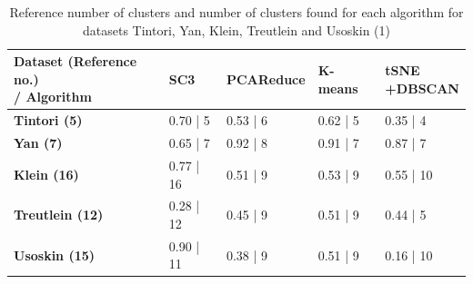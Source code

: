 \documentclass{report}
\begin{document}
{\begin{table}[H]
\centering
\caption{Reference number of clusters and number of clusters found for each algorithm for datasets Tintori, Yan, Klein, Treutlein and Usoskin (1)}
\begin{tabular}{| l | l | l | l | l |}
\hline
\parbox[c]{5cm}{\textbf{Dataset (Reference no.)\\ / Algorithm}} & 
\parbox[c]{2cm}{\textbf{SC3}} & 
\parbox[c]{2cm}{\textbf{PCAReduce}} &
\parbox[c]{2cm}{\textbf{K-means}}&
\parbox[c]{2cm}{\textbf{tSNE\\+DBSCAN}}\\
\hline
\parbox[c]{5cm}{\textbf{Tintori (5)}} & 
\parbox[c]{2cm}{0.70 | 5} & 
\parbox[c]{2cm}{0.53 | 6} &
\parbox[c]{2cm}{0.62 | 5}&
\parbox[c]{2cm}{0.35 | 4}\\
\hline
\parbox[c]{5cm}{\textbf{Yan (7)}} & 
\parbox[c]{2cm}{0.65 | 7} & 
\parbox[c]{2cm}{0.92 | 8} &
\parbox[c]{2cm}{0.91 | 7}&
\parbox[c]{2cm}{0.87 | 7}\\
\hline
\parbox[c]{5cm}{\textbf{Klein (16)}} & 
\parbox[c]{2cm}{0.77 | 16} & 
\parbox[c]{2cm}{0.51 | 9} &
\parbox[c]{2cm}{0.53 | 9}&
\parbox[c]{2cm}{0.55 | 10}\\
\hline
\parbox[c]{5cm}{\textbf{Treutlein (12)}} & 
\parbox[c]{2cm}{0.28 | 12} & 
\parbox[c]{2cm}{0.45 | 9} &
\parbox[c]{2cm}{0.51 | 9}&
\parbox[c]{2cm}{0.44 | 5}\\
\hline
\parbox[c]{5cm}{\textbf{Usoskin (15)}} & 
\parbox[c]{2cm}{0.90 | 11} & 
\parbox[c]{2cm}{0.38 | 9} &
\parbox[c]{2cm}{0.51 | 9}&
\parbox[c]{2cm}{0.16 | 10}\\
\hline
\end{tabular}
\label{numberclusters21}
\end{table}

}
\end{document}
